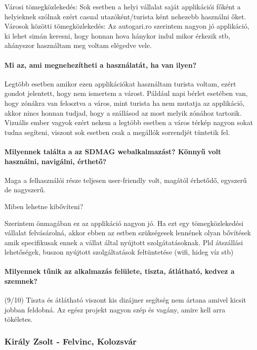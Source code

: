 Városi tömegközlekedés: 
Sok esetben a helyi vállalat saját applikációi főként a helyieknek szólnak ezért casual utazóként/turista ként nehezebb használni őket.
Városok közötti tömegközlekedés:
Az autogari.ro szerintem nagyon jó applikáció, ki lehet simán keresni, hogy honnan hova hánykor indul mikor érkezik stb, ahányszor használtam meg voltam elégedve vele.

\paragraph*{Mi az, ami megnehezítheti a használatát, ha van ilyen?}

Legtöbb esetben amikor ezen applikációkat használtam turista voltam, ezért gondot jelentett, hogy nem ismertem a várost. Páldául napi bérlet esetében van, hogy zónákra van felosztva a város, mint turista ha nem mutatja az applikáció, akkor nincs honnan tudjad, hogy a szállásod az most melyik zónához tartozik.
Vizuális ember vagyok ezért nekem a legtöbb esetben a város térkép nagyon sokat tudna segíteni, viszont sok esetben csak a megállók sorrendjét tüntetik fel.

\paragraph*{Milyennek találta a az SDMAG webalkalmazást? Könnyű volt használni, navigálni, érthető? }


Maga a felhasználói része teljesen user-friendly volt,  magától érhetődő, egyszerű de nagyszerű.

Miben lehetne kibővíteni?

Szerintem önmagában ez az applikáció nagyon jó. Ha ezt egy tömegközlekedési vállalat felvásárolná, akkor ebben az estben szükségesek lennének olyan bővítések amik specifikusak ennek a vállat által nyújtott szolgátatásoknak. Pld átszállási lehetőségek, buszon nyújtott szolgáltatások feltüntetése (wifi, hideg víz stb)

\paragraph*{Milyennek tűnik az alkalmazás felülete, tiszta, átlátható, kedvez a szemnek? }

(9/10) Tiszta és átlátható viszont kis dizájner segítség nem ártana amivel kicsit jobban feldobná. Az egész projekt nagyon szép és vagány, amire kell arra tökéletes.

\subsubsection{Király Zsolt - Felvinc, Kolozsvár}


